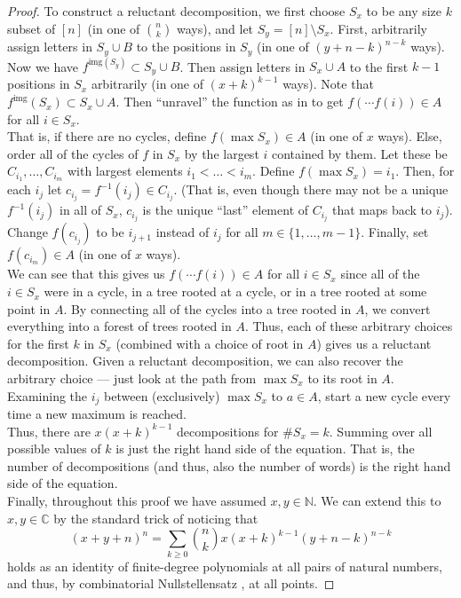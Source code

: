 \begin{proof}
	To construct a reluctant decomposition, we first choose $S_{x}$ to be any size $k$ subset of $[n]$ (in one of $\binom{n}{k}$ ways), and let $S_{y} = [n] \setminus S_{x}$. First, arbitrarily assign letters in $S_{y} \cup B$ to the positions in $S_{y}$ (in one of $(y + n - k)^{n - k}$ ways). Now we have $f^{\text{img}(S_{y})} \subset S_{y} \cup B$. Then assign letters in $S_{x} \cup A$ to the first $k - 1$ positions in $S_{x}$ arbitrarily (in one of $(x + k)^{k - 1}$ ways). Note that $f^{\text{img}}(S_{x}) \subset S_{x} \cup A$. Then ``unravel'' the function as in \cite{shapiro-1991} to get $f(\cdots f(i)) \in A$ for all $i \in S_{x}$. \\

	That is, if there are no cycles, define $f(\max S_{x}) \in A$ (in one of $x$ ways). Else, order all of the cycles of $f$ in $S_{x}$ by the largest $i$ contained by them. Let these be $C_{i_{1}}, \dots, C_{i_{m}}$ with largest elements $i_{1} < \dots < i_{m}$. Define $f(\max S_{x}) = i_{1}$. Then, for each $i_{j}$ let $c_{i_{j}} = f^{-1}(i_{j}) \in C_{i_j}$. (That is, even though there may not be a unique  $f^{-1}(i_{j})$ in all of $S_{x}$, $c_{i_{j}}$ is the unique ``last'' element of $C_{i_{j}}$ that maps back to $i_{j}$). Change $f(c_{i_{j}})$ to be $i_{j + 1}$ instead of $i_{j}$ for all $m \in \{ 1, \dots, m - 1 \}$. Finally, set $f(c_{i_{m}}) \in A$ (in one of $x$ ways). \\

	We can see that this gives us $f(\cdots f(i)) \in A$ for all $i \in S_{x}$ since all of the $i \in S_{x}$ were in a cycle, in a tree rooted at a cycle, or in a tree rooted at some point in $A$. By connecting all of the cycles into a tree rooted in $A$, we convert everything into a forest of trees rooted in $A$. Thus, each of these arbitrary choices for the first $k$ in $S_{x}$ (combined with a choice of root in $A$) gives us a reluctant decomposition. Given a reluctant decomposition, we can also recover the arbitrary choice --- just look at the path from $\max S_{x}$ to its root in $A$. Examining the $i_{j}$ between (exclusively) $\max S_{x}$ to $a \in A$, start a new cycle every time a new maximum is reached. \\

	Thus, there are $x(x + k)^{k - 1}$ decompositions for $\# S_{x} = k$. Summing over all possible values of $k$ is just the right hand side of the equation. That is, the number of decompositions (and thus, also the number of words) is the right hand side of the equation. \\

	Finally, throughout this proof we have assumed $x, y \in \mathbb{N}$. We can extend this to $x, y \in \mathbb{C}$ by the standard trick of noticing that
	\[
		(x + y + n)^{n} = \sum_{k \ge 0} \binom{n}{k} x (x + k)^{k - 1} (y + n - k)^{n - k}
	\]
	holds as an identity of finite-degree polynomials at all pairs of natural numbers, and thus, by combinatorial Nullstellensatz \cite{alon-1999}, at all points.
\end{proof}

